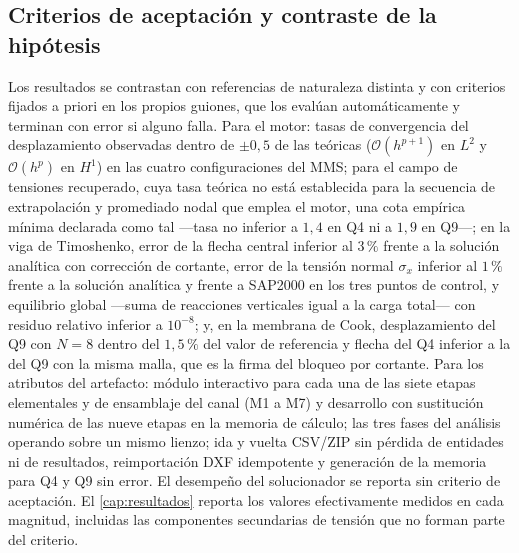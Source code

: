 \subsection{Criterios de aceptación y contraste de la hipótesis}
\label{sec:validacion-resultados}

Los resultados se contrastan con referencias de naturaleza distinta y con criterios fijados a priori en los propios guiones, que los evalúan automáticamente y terminan con error si alguno falla. Para el motor: tasas de convergencia del desplazamiento observadas dentro de $\pm0{,}5$ de las teóricas ($\mathcal{O}(h^{p+1})$ en $L^2$ y $\mathcal{O}(h^{p})$ en $H^1$) en las cuatro configuraciones del MMS; para el campo de tensiones recuperado, cuya tasa teórica no está establecida para la secuencia de extrapolación y promediado nodal que emplea el motor, una cota empírica mínima declarada como tal —tasa no inferior a $1{,}4$ en Q4 ni a $1{,}9$ en Q9—; en la viga de Timoshenko, error de la flecha central inferior al $3\,\%$ frente a la solución analítica con corrección de cortante, error de la tensión normal $\sigma_x$ inferior al $1\,\%$ frente a la solución analítica y frente a SAP2000 en los tres puntos de control, y equilibrio global —suma de reacciones verticales igual a la carga total— con residuo relativo inferior a $10^{-8}$; y, en la membrana de Cook, desplazamiento del Q9 con $N=8$ dentro del $1{,}5\,\%$ del valor de referencia y flecha del Q4 inferior a la del Q9 con la misma malla, que es la firma del bloqueo por cortante. Para los atributos del artefacto: módulo interactivo para cada una de las siete etapas elementales y de ensamblaje del canal (M1 a M7) y desarrollo con sustitución numérica de las nueve etapas en la memoria de cálculo; las tres fases del análisis operando sobre un mismo lienzo; ida y vuelta CSV/ZIP sin pérdida de entidades ni de resultados, reimportación DXF idempotente y generación de la memoria para Q4 y Q9 sin error. El desempeño del solucionador se reporta sin criterio de aceptación. El \autoref{cap:resultados} reporta los valores efectivamente medidos en cada magnitud, incluidas las componentes secundarias de tensión que no forman parte del criterio.

